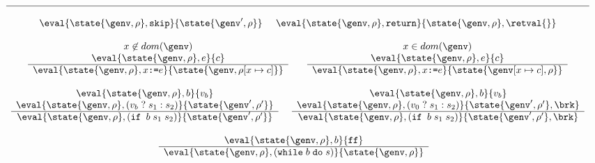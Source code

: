\begin{figure}[tbp]
\begin{displaymath}
\begin{array}{c}
\hline
\ \\
\eval{\state{\genv,\rho},\texttt{skip}}{\state{\genv',\rho}}
\;\;\;\;\;
\eval{\state{\genv,\rho},\texttt{return}}{\state{\genv,\rho},\retval{}} \\
\ \\
\begin{array}{c}
x \not\in dom(\genv) \\
\eval{\state{\genv,\rho},e}{c} \\
\hline
\eval{\state{\genv,\rho},x \texttt{:=}e}{\state{\genv,\rho[x \mapsto c]}}
\end{array}
\;\;\;\;\;\;\;
\begin{array}{c}
x \in dom(\genv) \\
\eval{\state{\genv,\rho},e}{c} \\
\hline
\eval{\state{\genv,\rho},x \texttt{:=}e}{\state{\genv[x \mapsto c],\rho}}
\end{array} \\
\ \\
\begin{array}{c}
\eval{\state{\genv,\rho},b}{v_b} \\
\eval{\state{\genv,\rho},(v_b \;?\; s_1 : s_2)}{\state{\genv',\rho'}} \\
\hline
\eval{\state{\genv,\rho},{(\texttt{if }b\;s_1\;s_2)}}{\state{\genv',\rho'}}
\end{array} 
\;\;\;\;\;
\begin{array}{c}
\eval{\state{\genv,\rho},b}{v_b} \\
\eval{\state{\genv,\rho},(v_0 \;?\; s_1 : s_2)}{\state{\genv',\rho'},\brk} \\
\hline
\eval{\state{\genv,\rho},{(\texttt{if }b\;s_1\;s_2)}}{\state{\genv',\rho'},\brk}
\end{array} \\
\ \\
\begin{array}{c}
\eval{\state{\genv,\rho},b}{\texttt{ff}} \\
\hline
\eval{\state{\genv,\rho},{(\texttt{while}\;b\;\texttt{do}\;s)}}{\state{\genv,\rho}}
\end{array}
\;\;\;
\begin{array}{c}

\end{array}
\end{array}
\end{displaymath}
\end{figure}
